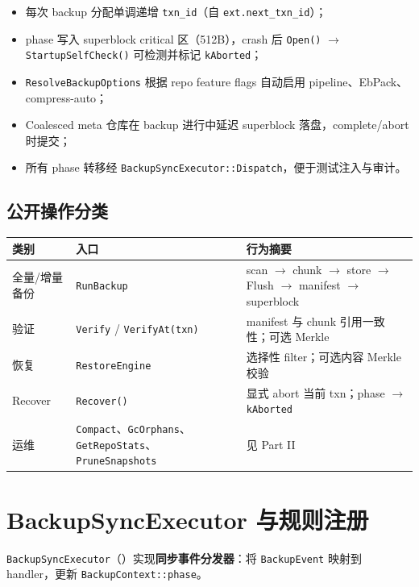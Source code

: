 \begin{designbox}[设计要点]
\begin{itemize}[nosep]
  \item 每次 backup 分配单调递增 \texttt{txn\_id}（自 \texttt{ext.next\_txn\_id}）；
  \item phase 写入 superblock critical 区（512B），crash 后 \texttt{Open()} $\rightarrow$ \texttt{StartupSelfCheck()} 可检测并标记 \texttt{kAborted}；
  \item \texttt{ResolveBackupOptions} 根据 repo feature flags 自动启用 pipeline、EbPack、compress-auto；
  \item Coalesced meta 仓库在 backup 进行中延迟 superblock 落盘，complete/abort 时提交；
  \item 所有 phase 转移经 \texttt{BackupSyncExecutor::Dispatch}，便于测试注入与审计。
\end{itemize}
\end{designbox}

\subsection{公开操作分类}

\begin{longtable}{@{}llp{7.5cm}@{}}
\toprule
类别 & 入口 & 行为摘要 \\
\midrule
全量/增量备份 & \texttt{RunBackup} & scan $\rightarrow$ chunk $\rightarrow$ store $\rightarrow$ Flush $\rightarrow$ manifest $\rightarrow$ superblock \\
验证 & \texttt{Verify} / \texttt{VerifyAt(txn)} & manifest 与 chunk 引用一致性；可选 Merkle \\
恢复 & \texttt{RestoreEngine} & 选择性 filter；可选内容 Merkle 校验 \\
Recover & \texttt{Recover()} & 显式 abort 当前 txn；phase $\rightarrow$ \texttt{kAborted} \\
运维 & \texttt{Compact}、\texttt{GcOrphans}、\texttt{GetRepoStats}、\texttt{PruneSnapshots} & 见 Part II \\
\bottomrule
\end{longtable}

\section{BackupSyncExecutor 与规则注册}

\texttt{BackupSyncExecutor}（）实现\textbf{同步事件分发器}：将 \texttt{BackupEvent} 映射到 handler，更新 \texttt{BackupContext::phase}。

